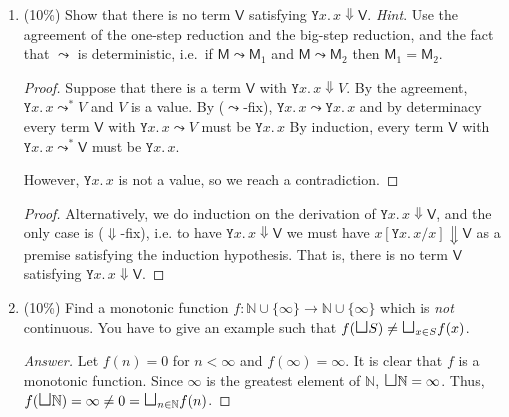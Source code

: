 \documentclass{article}
\begin{document}
\begin{enumerate}
\begin{enumerate}
\begin{proof}[Answer]
\[\begin{cases}
            d_3 & \text{if } d_1 > 0
          \end{cases}
          \]
        \end{proof}
    \end{enumerate}
  \item (10\%) Show that there is no term $\mathsf{V}$ satisfying
    $\mathtt{Y} x.\,x\Downarrow \mathsf{V}$.
    \textit{Hint}. Use the agreement of the one-step reduction and the big-step
    reduction, and the fact that $\leadsto$ is deterministic, i.e.\ 
    if $\mathsf{M} \leadsto \mathsf{M}_1$ and $\mathsf{M} \leadsto
    \mathsf{M}_2$ then $\mathsf{M}_1 = \mathsf{M}_2$. 
        \begin{proof}
          Suppose that there is a term $\mathsf{V}$ with $\mathtt{Y} x.\,
          x\Downarrow V$. By the agreement, $\mathtt{Y} x.\, x \leadsto^* V$
          and $V$ is a value.  By ($\leadsto$-fix),
          $\mathtt{Y} x.\,x\leadsto \mathtt{Y} x.\, x$
          and by determinacy every term $\mathsf{V}$ with $\mathtt{Y} x.\, x \leadsto V$ 
          must be $\mathtt{Y} x.\,x$ 
          By induction, every term $\mathsf{V}$ with $\mathtt{Y} x.\, x
          \leadsto^*\mathsf{V}$ must be $\mathtt{Y} x.\, x$. 

          However, $\mathtt{Y}x.\,x$ is not a value, so we reach a contradiction. 
        \end{proof}
        \begin{proof}
          Alternatively, we do induction on the derivation of $\mathtt{Y}x.\,x
          \Downarrow \mathsf{V}$, and the only case is ($\Downarrow$-fix), i.e. 
          to have $\mathtt{Y}x.\, x\Downarrow \mathsf{V}$ we must have
          ${x[\mathtt{Y}x.\, x/x] \Downarrow \mathsf{V}}$ as a premise
          satisfying the induction hypothesis. That is, there is no term
          $\mathsf{V}$ satisfying $\mathtt{Y} x.\,x \Downarrow \mathsf{V}$. 
        \end{proof}
  \item (10\%) Find a monotonic function
    $f : \mathbb{N} \cup \{\infty\}  \to \mathbb{N} \cup \{\infty\}$
    which is \emph{not} continuous. You have to give an example
    such that $f({\mbox{\Large $\sqcup$}} S) \neq
    {\mbox{\Large $\sqcup$}}_{x \in S} f(x)$.
        \begin{proof}[Answer]
          Let $f(n) = 0$ for $n < \infty$ and $f(\infty) = \infty$. 
          It is clear that $f$ is a monotonic function. 
          Since $\infty$ is the greatest element of $\mathbb{N}$,
          $\mbox{\Large $\sqcup$} \mathbb{N} = \infty$.
          Thus, $f(\mbox{\Large $\sqcup$} \mathbb{N}) = \infty
          \neq 0 = \mbox{\Large $\sqcup$}_{n \in \mathbb{N}} f(n)$.
        \end{proof}
\end{enumerate}
\end{document}
